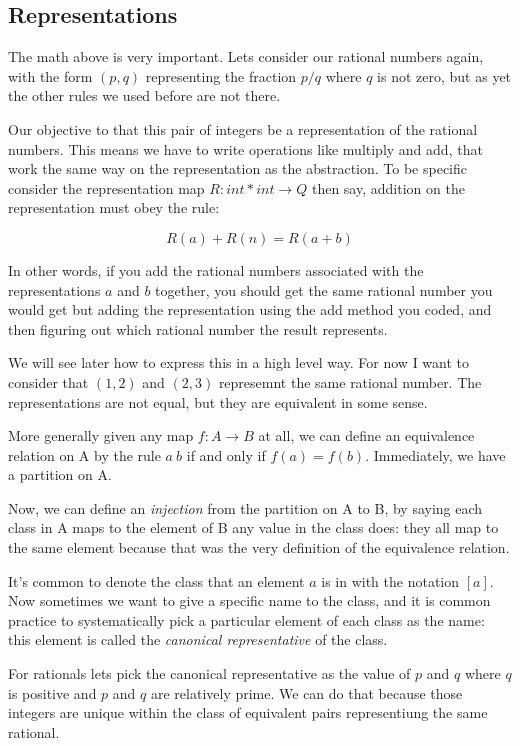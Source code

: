 \documentclass[oneside]{book}
\theoremstyle{plain}
\theoremstyle{definition}
\theoremstyle{plain}
\begin{document}
\subsection{Representations}
The math above is very important. Lets consider our rational
numbers again, with the form $(p,q)$ representing the fraction $p/q$
where $q$ is not zero, but as yet the other rules we used before are not 
there.

Our objective to that this pair of integers be a representation
of the rational numbers. This means we have to write operations
like multiply and add, that work the same way on the representation
as the abstraction. To be specific consider the representation
map $R: int * int \rightarrow  Q$ then say, addition on the representation
must obey the rule:

$$R(a) + R(n) = R(a + b)$$

In other words, if you add the rational numbers associated with
the representations $a$ and $b$ together, you should get the
same rational number you would get but adding the representation
using the add method you coded, and then figuring out which rational
number the result represents.

We will see later how to express this in a high level way.
For now I want to consider that $(1,2)$ and $(2,3)$ represemnt
the same rational number. The representations are not equal,
but they are equivalent in some sense.

More generally given any map $f:A\rightarrow B$ at all, we can define
an equivalence relation on A by the rule $a~b$ if and only
if $f(a) = f(b)$. Immediately, we have a partition on A.

Now, we can define an {\em injection} from the partition on
A to B, by saying each class in A maps to the element of
B any value in the class does: they all map to the same
element because that was the very definition of the equivalence
relation.

It's common to denote the class that an element $a$ is in
with the notation $[a]$. Now sometimes we want to give
a specific name to the class, and it is common practice
to systematically pick a particular element of each class
as the name: this element is called the {\em canonical
representative} of the class.

For rationals lets pick the canonical representative
as the value of $p$ and $q$ where $q$ is positive and
$p$ and $q$ are relatively prime. We can do that because
those integers are unique within the class of equivalent
pairs representiung the same rational.
\end{document}
